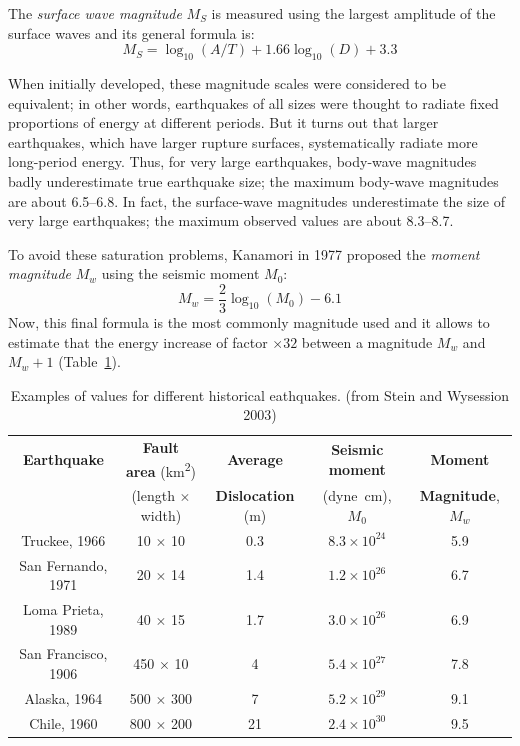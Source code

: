 The \textit{surface wave magnitude} $M_S$ is measured using the largest amplitude of the surface waves and its general formula is: 
\begin{equation}
    M_S= \log_{10} (A/T) + 1.66 \log_{10} (D) +3.3
\end{equation}

When initially developed, these magnitude scales were considered to be equivalent; in other words, earthquakes of all sizes were thought to radiate fixed proportions of energy at different periods. But it turns out that larger earthquakes, which have larger rupture surfaces, systematically radiate more long-period energy. Thus, for very large earthquakes, body-wave magnitudes badly underestimate true earthquake size; the maximum body-wave magnitudes are about 6.5--6.8. In fact, the surface-wave magnitudes underestimate the size of very large earthquakes; the maximum observed values are about 8.3--8.7.

To avoid these saturation problems, Kanamori in 1977 proposed the \textit{moment magnitude} $M_w$ using the seismic moment $M_0$:
\begin{equation}
    M_w = \frac{2}{3} \log_{10} (M_0) - 6.1
\end{equation}
Now, this final formula is the most commonly magnitude used and it allows to estimate that the energy increase of factor $\times 32$  between a magnitude $M_w$ and $M_w+1$  (Table~\ref{tab:table_Seismic_Energy}).

\begin{table}[h]
    \caption{Examples of values for different historical eathquakes. (from Stein
    and Wysession 2003)}
    \label{tab:table_Seismic_Energy}
    \begin{tabular}{ccccc}
        \toprule 
        \textbf{Earthquake} &
        \textbf{Fault area} (\si{km^2}) &
        \textbf{Average} &
        \textbf{Seismic moment} &
        \textbf{Moment} \\ 
        {} &
        (length $\times$ width) &
        \textbf{Dislocation} (\si{m}) &
        (\si{dyne.cm}), $M_0$ &
        \textbf{Magnitude}, $M_w$ \\ 
        \midrule 
        Truckee, 1966 & 10 $\times$ 10 & 0.3  & $8.3 \times 10^{24}$ & 5.9 \\ 
        San Fernando, 1971 & 20 $\times$ 14 & 1.4  & $1.2 \times 10^{26}$ & 6.7 \\ 
        Loma Prieta, 1989 & 40 $\times$ 15 & 1.7 & $3.0 \times 10^{26}$ & 6.9 \\ 
        San Francisco, 1906 & 450 $\times$ 10& 4 & $5.4 \times 10^{27}$  & 7.8 \\ 
        Alaska, 1964 & 500 $\times$ 300 & 7 & $5.2 \times 10^{29}$ & 9.1 \\ 
        Chile, 1960 & 800 $\times$ 200 & 21 & $2.4 \times 10^{30}$ & 9.5 \\ 
        \bottomrule 
    \end{tabular} 
\end{table}


